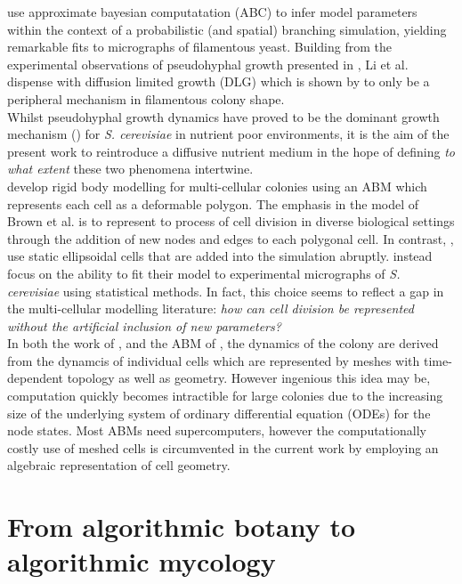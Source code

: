  \cite{li2024off} use approximate bayesian computatation (ABC)
 to infer model parameters within the context of a probabilistic (and spatial) branching simulation, 
 yielding remarkable fits to micrographs of filamentous yeast. Building 
 from the experimental observations of pseudohyphal growth presented in 
 \cite{gimeno1992unipolar}, Li et al. dispense with diffusion limited growth (DLG) which is
shown by \cite{tronnolone2018diffusion} to only be a peripheral mechanism in filamentous 
colony shape.
\\

Whilst pseudohyphal growth dynamics
have proved to be the dominant growth mechanism (\cite{tronnolone2018diffusion}) for 
\textit{S. cerevisiae} in nutrient poor environments, it is the aim of the present 
work to reintroduce a diffusive nutrient medium in the hope of defining 
\textit{to what extent} these two phenomena intertwine.
\\

\cite{brown2021rigid} develop rigid body modelling for multi-cellular colonies using 
an ABM which represents each cell as a deformable polygon. The emphasis in the model 
of Brown et al. is to represent to process of cell division in diverse biological 
settings through the addition of new nodes and edges to each polygonal cell. 
In contrast, \cite{li2024off}, use static ellipsoidal cells that are added into the simulation
abruptly. \cite{li2024off} instead focus on the ability to fit their model 
to experimental micrographs of \textit{S. cerevisiae} using statistical methods.
In fact, this choice seems to reflect a gap in the multi-cellular modelling literature:
\textit{how can cell division be represented without the artificial inclusion of new parameters?}
\\

In both the work of \cite{van2020quantitative}, and the ABM of 
\cite{brown2021rigid}, the dynamics of the colony 
are derived from the dynamcis of individual cells which are represented
by meshes with time-dependent topology as well as geometry. However ingenious this idea may be, 
computation quickly becomes intractible for large colonies
due to the increasing size of the underlying system of ordinary differential equation (ODEs)
for the node states. Most ABMs need supercomputers, however
the computationally costly use of meshed cells is circumvented in the current work by employing 
an algebraic representation of cell geometry.
\\

\section{From algorithmic botany to algorithmic mycology}


